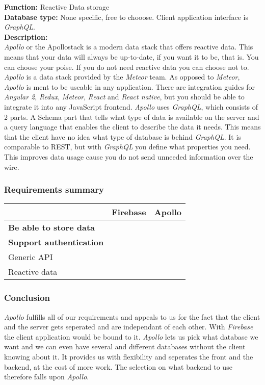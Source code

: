 \textbf{Function:} Reactive Data storage
\\
\textbf{Database type:} None specific, free to chooose. Client application interface is \textit{GraphQL}.
\\
\textbf{Description:}
\\
\textit{Apollo} or the Apollostack is a modern data stack that offers reactive data. This means that your data will always be up-to-date, if you want it to be, that is. You can choose your poise. If you do not need reactive data you can choose not to. \textit{Apollo} is a data stack provided by the \textit{Meteor} team. As opposed to \textit{Meteor}, \textit{Apollo} is ment to be useable in any application. There are integration guides for \textit{Angular 2}, \textit{Redux}, \textit{Meteor}, \textit{React} and \textit{React native}, but you should be able to integrate it into any JavaScript frontend. \textit{Apollo} uses \textit{GraphQL}, which consists of 2 parts. A Schema part that tells what type of data is available on the server and a query language that enables the client to describe the data it needs. This means that the client have no idea what type of database is behind \textit{GraphQL}. It is comparable to REST, but with \textit{GraphQL} you define what properties you need. This improves data usage cause you do not send unneeded information over the wire.


\subsubsection{Requirements summary}
	
	\begin{tabularx}{\textwidth}{|l|C C|}
	\hline 
	 & Firebase & Apollo \\ 
	\hline 
	\textbf{Be able to store data} & \cmark & \cmark \\ 
	\hline
	\textbf{Support authentication} & \cmark & \cmark \\ 
	\hline 
	Generic API & \xmark & \cmark \\ 
	\hline 
	Reactive data & \cmark & \cmark \\ 
	\hline 	
	\end{tabularx} 
	
\subsubsection{Conclusion}
\textit{Apollo} fulfills all of our requirements and appeals to us for the fact that the client and the server gets seperated and are independant of each other. With \textit{Firebase} the client application would be bound to it. \textit{Apollo} lets us pick what database we want and we can even have several and different databases without the client knowing about it. It provides us with flexibility and seperates the front and the backend, at the cost of more work. The selection on what backend to use therefore falls upon \textit{Apollo}.